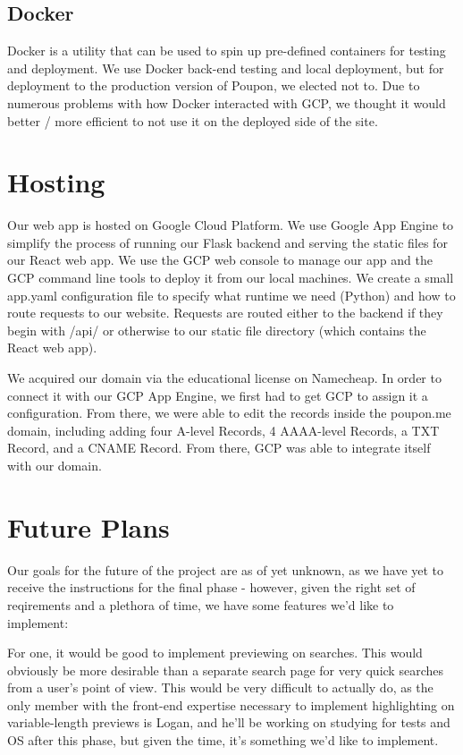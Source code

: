 \documentclass{scrartcl}
\begin{document}
    \subsection{Docker}\label{subsec:docker}
    Docker is a utility that can be used to spin up pre-defined containers for testing and deployment.
    We use Docker back-end testing and local deployment, but for deployment to the production version of Poupon, we elected not to.
    Due to numerous problems with how Docker interacted with GCP, we thought it would better / more efficient to not use it on the deployed side of the site.

    \newpage
    \section{Hosting}\label{sec:hosting}
    Our web app is hosted on Google Cloud Platform.
    We use Google App Engine to simplify the process of running our Flask backend and serving the static files for our React web app.
    We use the GCP web console to manage our app and the GCP command line tools to deploy it from our local machines.
    We create a small app.yaml configuration file to specify what runtime we need (Python) and how to route requests to our website.
    Requests are routed either to the backend if they begin with /api/ or otherwise to our static file directory (which contains the React web app).

    We acquired our domain via the educational license on Namecheap.
    In order to connect it with our GCP App Engine, we first had to get GCP to assign it a configuration.
    From there, we were able to edit the records inside the poupon.me domain, including adding four A-level Records, 4 AAAA-level Records, a TXT Record, and a CNAME Record.
    From there, GCP was able to integrate itself with our domain.


    \section{Future Plans}\label{sec:futurePlans}
    Our goals for the future of the project are as of yet unknown, as we have yet to receive the instructions for the final phase - however, given the right set of reqirements and a plethora of time, we have some features we'd like to implement:

    For one, it would be good to implement previewing on searches.
    This would obviously be more desirable than a separate search page for very quick searches from a user's point of view.
    This would be very difficult to actually do, as the only member with the front-end expertise necessary to implement highlighting on variable-length previews is Logan, and he'll be working on studying for tests and OS after this phase, but given the time, it's something we'd like to implement.
\end{document}
